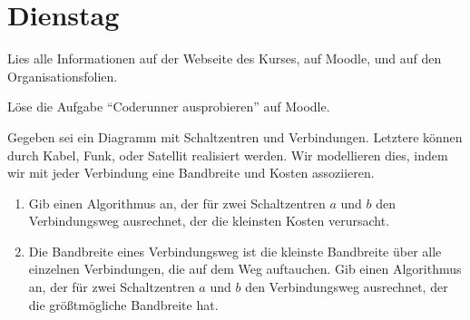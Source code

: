 \documentclass{uebung_cs}
\begin{document}
\section*{Dienstag}

\begin{aufgabe}[Orga]
    Lies alle Informationen auf der Webseite des Kurses, auf Moodle, und auf den Organisationsfolien.
\end{aufgabe}

\begin{aufgabe}[Coderunner]
    Löse die Aufgabe \enquote{Coderunner ausprobieren} auf Moodle.
\end{aufgabe}


\begin{aufgabe}[Telefonnetzwerk]
    Gegeben sei ein Diagramm mit Schaltzentren und Verbindungen.
    Letztere können durch Kabel, Funk, oder Satellit realisiert werden.
    Wir modellieren dies, indem wir mit jeder Verbindung eine Bandbreite und Kosten assoziieren.
    \begin{enumerate}
        \item Gib einen Algorithmus an, der für zwei Schaltzentren $a$ und $b$ den Verbindungsweg ausrechnet, der die kleinsten Kosten verursacht.
        \item Die Bandbreite eines Verbindungsweg ist die kleinste Bandbreite über alle einzelnen Verbindungen, die auf dem Weg auftauchen.
        Gib einen Algorithmus an, der für zwei Schaltzentren $a$ und $b$ den Verbindungsweg ausrechnet, der die größtmögliche Bandbreite hat.
    \end{enumerate}
\end{aufgabe}
\end{document}
